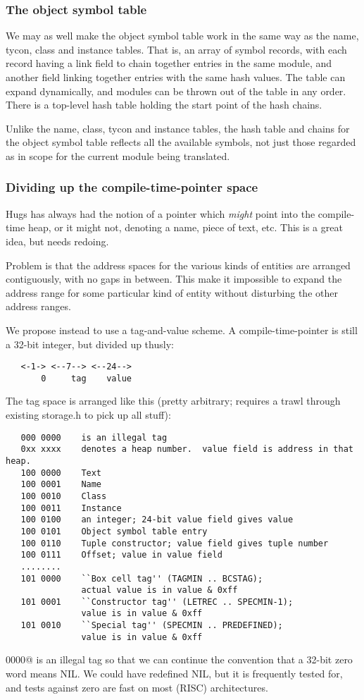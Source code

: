 \subsubsection*{The object symbol table}

We may as well make the object symbol table work in the same way as
the name, tycon, class and instance tables.  That is, an array of 
symbol records, with each record having a link field to chain together
entries in the same module, and another field linking together entries
with the same hash values.  The table can expand dynamically, and
modules can be thrown out of the table in any order.  There is a
top-level hash table holding the start point of the hash chains.

Unlike the name, class, tycon and instance tables, the hash table
and chains for the object symbol table reflects all the available
symbols, not just those regarded as in scope for the current module
being translated.

\subsubsection*{Dividing up the compile-time-pointer space}

Hugs has always had the notion of a pointer which {\em might}
point into the compile-time heap, or it might not, denoting a 
name, piece of text, etc.  This is a great idea, but needs redoing.

Problem is that the address spaces for the various kinds of
entities are arranged contiguously, with no gaps in between.  This
make it impossible to expand the address range for some particular
kind of entity without disturbing the other address ranges.

We propose instead to use a tag-and-value scheme.  A
compile-time-pointer
is still a 32-bit integer, but divided up thusly:
\begin{verbatim}
   <-1-> <--7--> <--24-->
       0     tag    value
\end{verbatim}
The tag space is arranged like this (pretty arbitrary; requires a
trawl through existing storage.h to pick up all stuff):
\begin{verbatim}
   000 0000    is an illegal tag
   0xx xxxx    denotes a heap number.  value field is address in that heap.
   100 0000    Text
   100 0001    Name
   100 0010    Class
   100 0011    Instance
   100 0100    an integer; 24-bit value field gives value
   100 0101    Object symbol table entry
   100 0110    Tuple constructor; value field gives tuple number
   100 0111    Offset; value in value field
   ........
   101 0000    ``Box cell tag'' (TAGMIN .. BCSTAG); 
               actual value is in value & 0xff
   101 0001    ``Constructor tag'' (LETREC .. SPECMIN-1); 
               value is in value & 0xff
   101 0010    ``Special tag'' (SPECMIN .. PREDEFINED);
               value is in value & 0xff
\end{verbatim}
 0000@ is an illegal tag so that we can continue the
convention
that a 32-bit zero word means NIL.  We could have redefined NIL, but
it is frequently tested for, and tests against zero are fast on most
(RISC) architectures.


